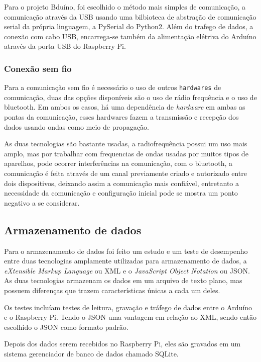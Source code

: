 \documentclass[final,12pt, times, 5p, twocolumn]{elsarticle}
\begin{document}
Para o projeto Bduíno, foi escolhido o método mais simples de comunicação, a comunicação através da USB usando uma bilbioteca de abstração de comunicação serial da própria linguagem, a PySerial do Python2. Além do trafego de dados, a conexão com cabo USB, encarrega-se também da alimentação elétriva do Arduíno através da porta USB do Raspberry Pi.

\subsubsection{Conexão sem fio}

Para a comunicação sem fio é necessário o uso de outros \texttt{hardwares} de comunicação, duas das opções disponíveis são o uso de rádio frequência e o uso de bluetooth. Em ambos os casos, há uma dependência de \textit{hardware} em ambas as pontas da comunicação, esses hardwares fazem a transmissão e recepção dos dados usando ondas como meio de propagação. 

As duas tecnologias são bastante usadas, a radiofrequência possui um uso mais amplo, mas por trabalhar com frequencias de ondas usadas por muitos tipos de aparelhos, pode ocorrer interferências na comunicação, com o bluetooth, a comunicação é feita através de um canal previamente criado e autorizado entre dois dispositivos, deixando assim a comunicação mais confiável, entretanto a necessidade da comunicação e configuração inicial pode se mostra um ponto negativo a se considerar.

\subsection{Armazenamento de dados}

Para o armazenamento de dados foi feito um estudo e um teste de desempenho entre duas tecnologias amplamente utilizadas para armazenamento de dados, a \textit{eXtensible Markup Language} ou XML e o \textit{JavaScript Object Notation} ou JSON. As duas tecnologias armazenam os dados em um arquivo de texto plano, mas possuem diferenças que trazem características únicas a cada um deles.

Os testes incluíam testes de leitura, gravação e tráfego de dados entre o Arduíno e o Raspberry Pi. Tendo o JSON uma vantagem em relação ao XML, sendo então escolhido o JSON como formato padrão.

Depois dos dados serem recebidos no Raspberry Pi, eles são gravados em um sistema gerenciador de banco de dados chamado SQLite. 
\end{document}
